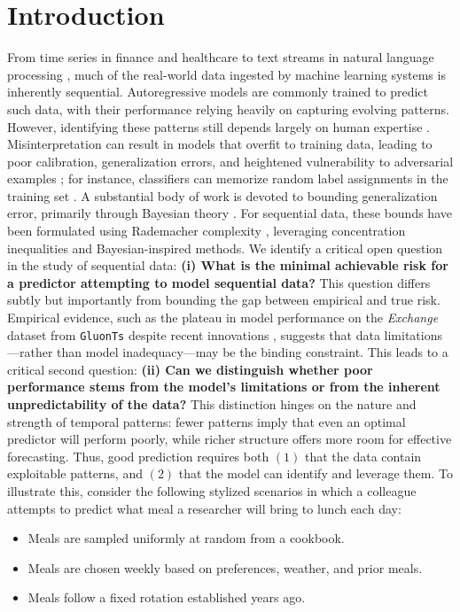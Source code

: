 \documentclass{article}
\begin{document}
\section{Introduction}
From time series in finance and healthcare \cite{ashok2023tactis, rasul2020multivariate, lim2021time} to text streams in natural language processing \cite{naveed2023comprehensive}, much of the real-world data ingested by machine learning systems is inherently sequential. Autoregressive models are commonly trained to predict such data, with their performance relying heavily on capturing evolving patterns. However, identifying these patterns still depends largely on human expertise \cite{zeng2025towards}. Misinterpretation can result in models that overfit to training data, leading to poor calibration, generalization errors, and heightened vulnerability to adversarial examples \cite{fischer2020conditional}; for instance, classifiers can memorize random label assignments in the training set \cite{zhang2016understanding}.
A substantial body of work is devoted to bounding generalization error, primarily through Bayesian theory \cite{alquier2024user}. For sequential data, these bounds have been formulated using Rademacher complexity \cite{mcdonald2011rademacher}, leveraging concentration inequalities and Bayesian-inspired methods.
We identify a critical open question in the study of sequential data: \textbf{(i) What is the minimal achievable risk for a predictor attempting to model sequential data?} This question differs subtly but importantly from bounding the gap between empirical and true risk. Empirical evidence, such as the plateau in model performance on the \emph{Exchange} dataset from \texttt{GluonTs} \cite{alexandrov2020gluonts} despite recent innovations \cite{rasul2021autoregressive}, suggests that data limitations—rather than model inadequacy—may be the binding constraint.
This leads to a critical second question:
\textbf{(ii) Can we distinguish whether poor performance stems from the model’s limitations or from the inherent unpredictability of the data?}
This distinction hinges on the nature and strength of temporal patterns: fewer patterns imply that even an optimal predictor will perform poorly, while richer structure offers more room for effective forecasting. Thus, good prediction requires both $(1)$ that the data contain exploitable patterns, and $(2)$ that the model can identify and leverage them.
To illustrate this, consider the following stylized scenarios in which a colleague attempts to predict what meal a researcher will bring to lunch each day:
\begin{itemize}
    \item Meals are sampled uniformly at random from a cookbook.
    \item Meals are chosen weekly based on preferences, weather, and prior meals.
    \item Meals follow a fixed rotation established years ago.
\end{itemize}
\end{document}
